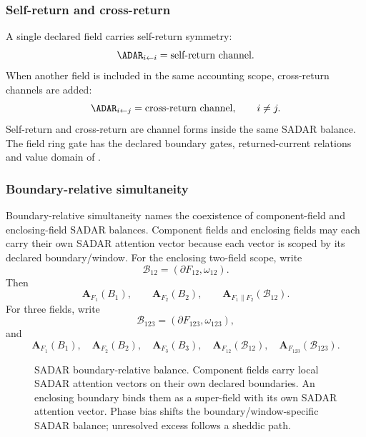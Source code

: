 \subsubsection{Self-return and cross-return}\label{subsec:self-cross-return}
A single declared field carries self-return symmetry:
\[
\ADAR_{i\leftarrow i}=\text{self-return channel}.
\]
When another field is included in the same accounting scope, cross-return channels are added:
\[
\ADAR_{i\leftarrow j}=\text{cross-return channel},\qquad i\ne j.
\]
Self-return and cross-return are channel forms inside the same SADAR balance. The field ring gate has the declared boundary gates, returned-current relations and value domain of .

\subsubsection{Boundary-relative simultaneity}\label{subsec:boundary-relative-simultaneity}
Boundary-relative simultaneity names the coexistence of component-field and enclosing-field SADAR balances. Component fields and enclosing fields may each carry their own SADAR attention vector because each vector is scoped by its declared boundary/window. For the enclosing two-field scope, write
\[
\mathcal{B}_{12}=(\partial F_{12},\omega_{12}).
\]
Then
\[
\mathbf A_{F_1}(B_1),
\qquad
\mathbf A_{F_2}(B_2),
\qquad
\mathbf A_{F_1\parallel F_2}(\mathcal{B}_{12}).
\]
For three fields, write
\[
\mathcal{B}_{123}=(\partial F_{123},\omega_{123}),
\]
and
\[
\mathbf A_{F_1}(B_1),\quad
\mathbf A_{F_2}(B_2),\quad
\mathbf A_{F_3}(B_3),\quad
\mathbf A_{F_{12}}(\mathcal{B}_{12}),\quad
\mathbf A_{F_{123}}(\mathcal{B}_{123}).
\]

\begin{figure}[H]
\centering
{}
\caption{SADAR boundary-relative balance. Component fields carry local SADAR attention vectors on their own declared boundaries. An enclosing boundary binds them as a super-field with its own SADAR attention vector. Phase bias shifts the boundary/window-specific SADAR balance; unresolved excess follows a sheddic path.}
\label{fig:sadar-boundary-relative-balance}
\end{figure}

